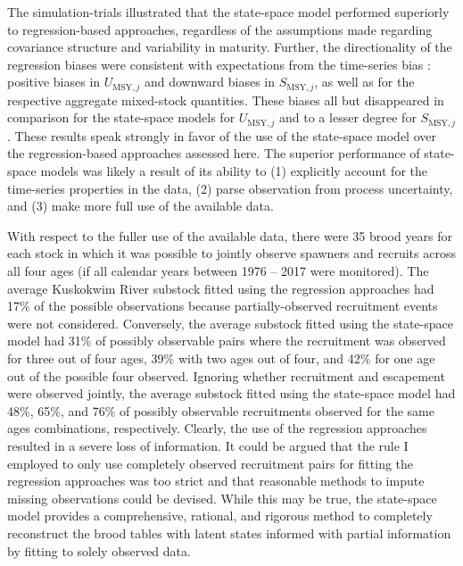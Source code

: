 \documentclass[12pt,]{book}
\theoremstyle{definition}
\theoremstyle{definition}
\theoremstyle{definition}
\theoremstyle{remark}
\begin{document}
The simulation-trials illustrated that the state-space model performed
superiorly to regression-based approaches, regardless of the assumptions
made regarding covariance structure and variability in maturity.
Further, the directionality of the regression biases were consistent
with expectations from the time-series bias \citep{walters-1985}:
positive biases in \(U_{\text{MSY},j}\) and downward biases in
\(S_{\text{MSY},j}\), as well as for the respective aggregate
mixed-stock quantities. These biases all but disappeared in comparison
for the state-space models for \(U_{\text{MSY},j}\) and to a lesser
degree for \(S_{\text{MSY},j}\). These results speak strongly in favor
of the use of the state-space model over the regression-based approaches
assessed here. The superior performance of state-space models was likely
a result of its ability to (1) explicitly account for the time-series
properties in the data, (2) parse observation from process uncertainty,
and (3) make more full use of the available data.

With respect to the fuller use of the available data, there were 35
brood years for each stock in which it was possible to jointly observe
spawners and recruits across all four ages (if all calendar years
between 1976 -- 2017 were monitored). The average Kuskokwim River
substock fitted using the regression approaches had 17\% of the possible
observations because partially-observed recruitment events were not
considered. Conversely, the average substock fitted using the
state-space model had 31\% of possibly observable pairs where the
recruitment was observed for three out of four ages, 39\% with two ages
out of four, and 42\% for one age out of the possible four observed.
Ignoring whether recruitment and escapement were observed jointly, the
average substock fitted using the state-space model had 48\%, 65\%, and
76\% of possibly observable recruitments observed for the same ages
combinations, respectively. Clearly, the use of the regression
approaches resulted in a severe loss of information. It could be argued
that the rule I employed to only use completely observed recruitment
pairs for fitting the regression approaches was too strict and that
reasonable methods to impute missing observations could be devised.
While this may be true, the state-space model provides a comprehensive,
rational, and rigorous method to completely reconstruct the brood tables
with latent states informed with partial information by fitting to
solely observed data.
\end{document}
